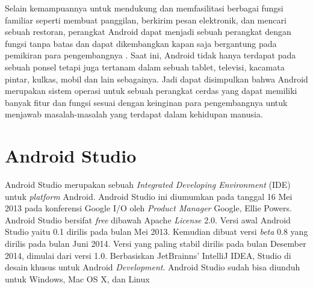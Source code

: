 	Selain kemampuannya untuk mendukung dan memfasilitasi berbagai fungsi familiar seperti membuat panggilan, berkirim pesan elektronik, dan mencari sebuah restoran, perangkat Android dapat menjadi sebuah perangkat dengan fungsi tanpa batas dan dapat dikembangkan kapan saja bergantung pada pemikiran para pengembangnya \cite{rogers}. Saat ini, Android tidak hanya terdapat pada sebuah ponsel tetapi juga tertanam dalam sebuah tablet, televisi, kacamata pintar, kulkas, mobil dan lain sebagainya. Jadi dapat disimpulkan bahwa Android merupakan sistem operasi untuk sebuah perangkat cerdas yang dapat memiliki banyak fitur dan fungsi sesuai dengan keinginan para pengembangnya untuk menjawab masalah-masalah yang terdapat dalam kehidupan manusia. 

\section{Android Studio}
	Android Studio merupakan sebuah \emph{Integrated Developing Environment} (IDE) untuk \emph{platform} Android. Android Studio ini diumumkan pada tanggal 16 Mei 2013 pada konferensi Google I/O oleh \emph{Product Manager} Google, Ellie Powers. Android Studio bersifat \emph{free} dibawah Apache \emph{License} 2.0. Versi awal Android Studio yaitu 0.1 dirilis pada bulan Mei 2013. Kemudian dibuat versi \emph{beta} 0.8 yang dirilis pada bulan Juni 2014. Versi yang paling stabil dirilis pada bulan Desember 2014, dimulai dari versi 1.0. Berbasiskan JetBrainns' IntelliJ IDEA, Studio di desain khusus untuk Android \emph{Development}. Android Studio sudah bisa diunduh untuk Windows, Mac OS X, dan Linux

